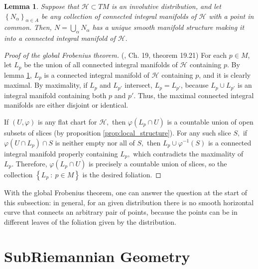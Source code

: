 \documentclass[12pt, letterpaper, reqno]{amsart}
\theoremstyle{definition}
\theoremstyle{plain}
\newtheorem{lm}{Lemma}
\theoremstyle{remark}
\begin{document}
\begin{lm}\label{lm:man_struct}
	Suppose that $ \mathcal{H}\subset TM $ is an involutive distribution, and let $ \left\{ N_\alpha \right\}_{\alpha\in A} $ be any collection of connected integral manifolds of $ \mathcal{H} $ with a point in common. Then, $ N=\bigcup_{\alpha} N_\alpha $ has a unique smooth manifold structure making it into a connected integral manifold of $ \mathcal{H}. $  
\end{lm}

\begin{proof}[Proof of the global Frobenius theorem]
	(\cite{lee2003introduction}, Ch. 19, theorem 19.21) For each $ p\in M $, let $ L_p $ be the union of all connected integral manifolds of $ \mathcal{H} $ containing $ p. $ By lemma \ref{lm:man_struct}, $ L_p $ is a connected integral manifold of $ \mathcal{H} $ containing $ p $, and it is clearly maximal. By maximality, if $ L_p $ and $ L_{p'} $ intersect, $ L_p=L_{p'} $, because $ L_p\cup L_{p'} $ is an integral manifold containing both $ p $ and $ p' $. Thus, the maximal connected integral manifolds are either disjoint or identical.    

	If $ (U,\varphi) $ is any flat chart for $ \mathcal{H}, $ then $ \varphi(L_p\cap U) $ is a countable union of open subsets of slices (by proposition \ref{prop:local_structure}). For any such slice $ S, $ if $ \varphi(U\cap L_p)\cap S $ is neither empty nor all of $ S, $ then $ L_p\cup \varphi^{-1}(S )$ is a connected integral manifold properly containing $ L_p, $ which contradicts the maximality of $ L_p. $ Therefore, $ \varphi(L_p\cap U) $ is precisely a countable union of slices, so the collection $ \left\{ L_p\ : \ p\in M \right\} $ is the desired foliation.
\end{proof}

With the global Frobenius theorem, one can answer the question at the start of this subsection: in general, for an given distribution there is no smooth horizontal curve that connects an arbitrary pair of points, because the points can be in different leaves of the foliation given by the distribution.


\section{SubRiemannian Geometry}%
\label{sec:subriemannian_geometry}
\end{document}
